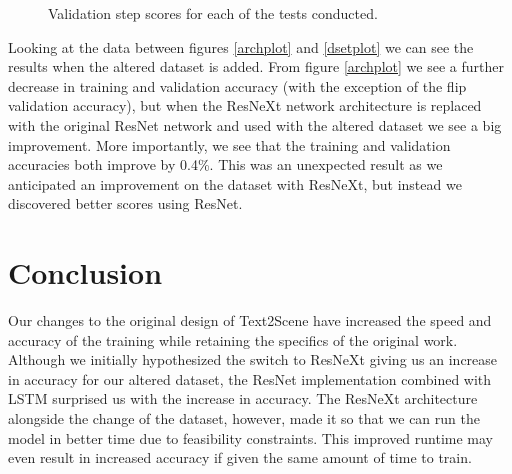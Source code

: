 \documentclass[10pt,twocolumn,letterpaper]{article}
\begin{document}
\begin{figure}[h]
\begin{center}
\end{center}
   \caption{Validation step scores for each of the tests conducted.}
\label{valstat}
\end{figure}

Looking at the data between figures \ref{archplot} and \ref{dsetplot} we can see the results when the altered dataset is added. From figure \ref{archplot} we see a further decrease in training and validation accuracy (with the exception of the flip validation accuracy), but when the ResNeXt network architecture is replaced with the original ResNet network and used with the altered dataset we see a big improvement. More importantly, we see that the training and validation accuracies both improve by 0.4\%. This was an unexpected result as we anticipated an improvement on the dataset with ResNeXt, but instead we discovered better scores using ResNet.


\section{Conclusion}

Our changes to the original design of Text2Scene have increased the speed and accuracy of the training while retaining the specifics of the original work. Although we initially hypothesized the switch to ResNeXt giving us an increase in accuracy for our altered dataset, the ResNet implementation combined with LSTM surprised us with the increase in accuracy. The ResNeXt architecture  alongside the change of the dataset, however,  made it so that we can run the model in better time due to feasibility constraints. This improved runtime may even result in increased accuracy if given the same amount of time to train.

%
%
%
%
%
%
%
%



\newpage
\newpage
{\small


}
\end{document}
